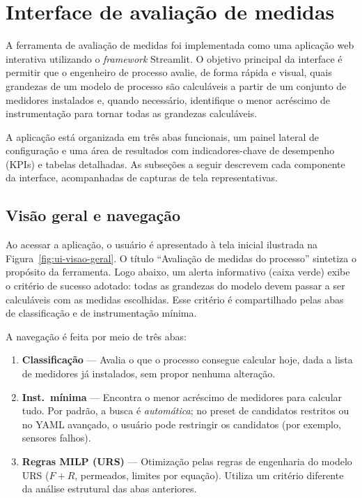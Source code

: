 
\section{Interface de avaliação de medidas}\label{sec:interface-ui}

A ferramenta de avaliação de medidas foi implementada como uma aplicação web
interativa utilizando o \emph{framework} Streamlit. O objetivo principal da
interface é permitir que o engenheiro de processo avalie, de forma rápida e
visual, quais grandezas de um modelo de processo são calculáveis a partir de
um conjunto de medidores instalados e, quando necessário, identifique o menor
acréscimo de instrumentação para tornar todas as grandezas calculáveis.

A aplicação está organizada em três abas funcionais, um painel lateral de
configuração e uma área de resultados com indicadores-chave de desempenho
(KPIs) e tabelas detalhadas. As subseções a seguir descrevem cada componente
da interface, acompanhadas de capturas de tela representativas.


\subsection{Visão geral e navegação}\label{ssec:ui-visao-geral}

Ao acessar a aplicação, o usuário é apresentado à tela inicial ilustrada na
Figura~\ref{fig:ui-visao-geral}. O título ``Avaliação de medidas do
processo'' sintetiza o propósito da ferramenta. Logo abaixo, um alerta
informativo (caixa verde) exibe o critério de sucesso adotado: todas as
grandezas do modelo devem passar a ser calculáveis com as medidas escolhidas.
Esse critério é compartilhado pelas abas de classificação e de instrumentação
mínima.

A navegação é feita por meio de três abas:

\begin{enumerate}[label=\arabic*.]
  \item \textbf{Classificação} --- Avalia o que o processo consegue calcular
        hoje, dada a lista de medidores já instalados, sem propor nenhuma
        alteração.
  \item \textbf{Inst.\ mínima} --- Encontra o menor acréscimo de medidores
        para calcular tudo. Por padrão, a busca é \emph{automática}; no
        preset de candidatos restritos ou no YAML avançado, o usuário pode
        restringir os candidatos (por exemplo, sensores falhos).
  \item \textbf{Regras MILP (URS)} --- Otimização pelas regras de engenharia
        do modelo URS ($F+R$, permeados, limites por equação). Utiliza um
        critério diferente da análise estrutural das abas anteriores.
\end{enumerate}

